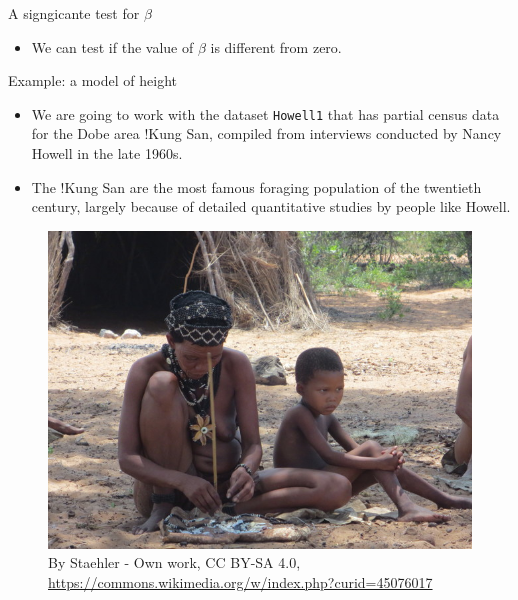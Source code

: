 \documentclass[handout]{beamer}
\begin{document}
\begin{frame}{A signgicante test for $\beta$}
\scriptsize{
\begin{itemize}
 \item We can test if the value of $\beta$ is different from zero.

\end{itemize}


}
 
\end{frame}


\begin{frame}[fragile]{Example: a model of height}
\scriptsize{
\begin{itemize}
 \item  We are going to work with the dataset \verb+Howell1+ that has  partial census data for the Dobe area !Kung San, compiled from interviews conducted by Nancy Howell in the late 1960s. 
 \item The !Kung San are the most famous foraging population of the twentieth century, largely because of detailed quantitative studies by people like Howell.
 \end{itemize} 

 
 \begin{figure}[h!]
	\centering
	\includegraphics[scale=0.6]{pics/San_Schmuck.jpg}
	\caption{By Staehler - Own work, CC BY-SA 4.0, \url{https://commons.wikimedia.org/w/index.php?curid=45076017}}
\end{figure}

 
}
\end{frame}
\end{document}
